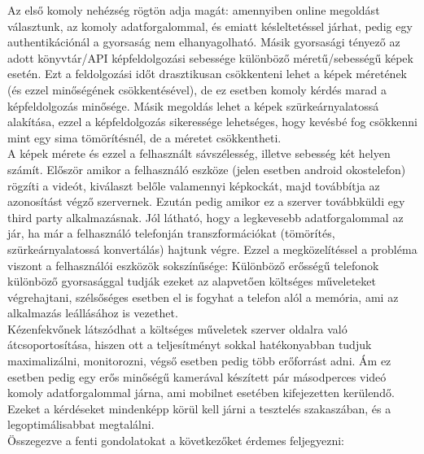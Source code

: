 Az első komoly nehézség rögtön adja magát: amennyiben online megoldást választunk, az komoly adatforgalommal, és emiatt késleltetéssel járhat, pedig egy authentikációnál a gyorsaság nem elhanyagolható. Másik gyorsasági tényező az adott könyvtár/API képfeldolgozási sebessége különböző méretű/sebességű képek esetén. Ezt a feldolgozási időt drasztikusan csökkenteni lehet a képek méretének (és ezzel minőségének csökkentésével), de ez esetben komoly kérdés marad a képfeldolgozás minősége. Másik megoldás lehet a képek szürkeárnyalatossá alakítása, ezzel a képfeldolgozás sikeressége lehetséges, hogy kevésbé fog csökkenni mint egy sima tömörítésnél, de a méretet csökkentheti.
\\A képek mérete és ezzel a felhasznált sávszélesség, illetve sebesség két helyen számít. Először amikor a felhasználó eszköze (jelen esetben android okostelefon) rögzíti a videót, kiválaszt belőle valamennyi képkockát, majd továbbítja az azonosítást végző szervernek. Ezután pedig amikor ez a szerver továbbküldi egy third party alkalmazásnak. Jól látható, hogy a legkevesebb adatforgalommal az jár, ha már a felhasználó telefonján transzformációkat (tömörítés, szürkeárnyalatossá konvertálás) hajtunk végre. Ezzel a megközelítéssel a probléma viszont a felhasználói eszközök sokszínűsége: Különböző erősségű telefonok különböző gyorsasággal tudják ezeket az alapvetően költséges műveleteket végrehajtani, szélsőséges esetben el is fogyhat a telefon alól a memória, ami az alkalmazás leállásához is vezethet.
\\Kézenfekvőnek látszódhat a költséges műveletek szerver oldalra való átcsoportosítása, hiszen ott a teljesítményt sokkal hatékonyabban tudjuk maximalizálni, monitorozni, végső esetben pedig több erőforrást adni. Ám ez esetben pedig egy erős minőségű kamerával készített pár másodperces videó komoly adatforgalommal járna, ami mobilnet esetében kifejezetten kerülendő.
Ezeket a kérdéseket mindenképp körül kell járni a tesztelés szakaszában, és a legoptimálisabbat megtalálni.
\\Összegezve  a fenti gondolatokat a következőket érdemes feljegyezni:

